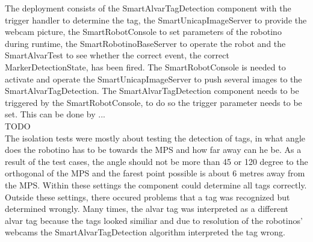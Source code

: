 The deployment consists of the SmartAlvarTagDetection component with the trigger handler to determine the tag, the SmartUnicapImageServer to provide the webcam picture, the SmartRobotConsole to set parameters of the robotino during runtime, the SmartRobotinoBaseServer to operate the robot and the SmartAlvarTest to see whether the correct event, the correct MarkerDetectionState, has been fired. The SmartRobotConsole is needed to activate and operate the SmartUnicapImageServer to push several images to the SmartAlvarTagDetection. The SmartAlvarTagDetection component needs to be triggered by the SmartRobotConsole, to do so the trigger parameter needs to be set. This can be done by ...\\ TODO \\

The isolation tests were mostly about testing the detection of tags, in what angle does the robotino has to be towards the MPS and how far away can he be. As a result of the test cases, the angle should not be more than 45 or 120 degree to the orthogonal of the MPS and the farest point possible is about 6 metres away from the MPS. Within these settings the component could determine all tags correctly. Outside these settings, there occured problems that a tag was recognized but determined wrongly. Many times, the alvar tag was interpreted as a different alvar tag because the tags looked similiar and due to resolution of the robotinos' webcams the SmartAlvarTagDetection algorithm interpreted the tag wrong.




